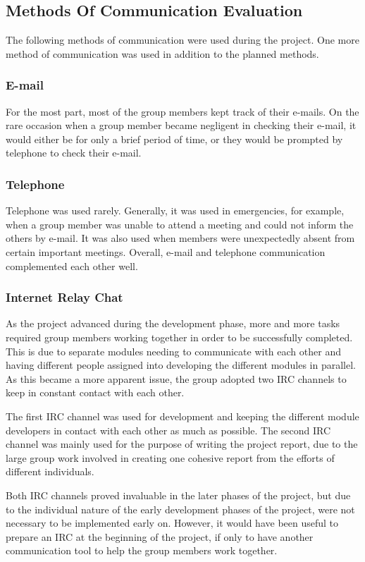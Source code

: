 \subsection{Methods Of Communication Evaluation}

The following methods of communication were used
during the project. One more method of communication
was used in addition to the planned methods.

\subsubsection{E-mail}

For the most part, most of the group members kept track
of their e-mails. On the rare occasion when a group member
became negligent in checking their e-mail, it would either be 
for only a brief period of time, or they would be prompted by
telephone to check their e-mail.

\subsubsection{Telephone}

Telephone was used rarely. Generally, it was used in 
emergencies, for example, 
when a group member was unable to attend a meeting
and could not inform the others by e-mail. It was also
used when members were unexpectedly absent from 
certain important meetings. Overall, e-mail and 
telephone communication complemented each other well.

\subsubsection{Internet Relay Chat}

As the project advanced during the development phase,
more and more tasks required group members working together
in order to be successfully completed. This is due to 
separate modules needing to communicate with each other
and having different people assigned into developing the different modules
in parallel. As this became a more apparent issue, the group adopted
two IRC channels to keep in constant contact with each other.

The first IRC channel was used for development and keeping the 
different module developers in contact with each other as much as possible. 
The second IRC channel was mainly used for the purpose of writing the project
report, due to the large group work involved in creating one cohesive report
from the efforts of different individuals.

Both IRC channels proved invaluable in the later phases of the project, but
due to the individual nature of the early development phases of the project,
were not necessary to be implemented early on. However, it would have been
useful to prepare an IRC at the beginning of the project, if only to have 
another communication tool to help the group members work together.
